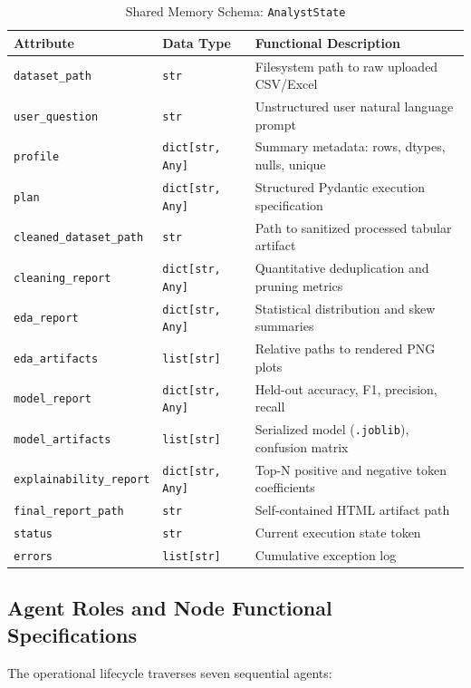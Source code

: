 \documentclass[conference]{IEEEtran}
\begin{document}
\begin{table}[htbp]
\caption{Shared Memory Schema: \texttt{AnalystState}}
\label{tab:state_contract}
\centering
\scriptsize
\begin{tabularx}{\columnwidth}{@{}p{}p{}X@{}}
\toprule
\textbf{Attribute} & \textbf{Data Type} & \textbf{Functional Description} \\
\midrule
\texttt{dataset\_path} & \texttt{str} & Filesystem path to raw uploaded CSV/Excel \\
\texttt{user\_question} & \texttt{str} & Unstructured user natural language prompt \\
\texttt{profile} & \texttt{dict[str, Any]} & Summary metadata: rows, dtypes, nulls, unique \\
\texttt{plan} & \texttt{dict[str, Any]} & Structured Pydantic execution specification \\
\texttt{cleaned\_dataset\_path} & \texttt{str} & Path to sanitized processed tabular artifact \\
\texttt{cleaning\_report} & \texttt{dict[str, Any]} & Quantitative deduplication and pruning metrics \\
\texttt{eda\_report} & \texttt{dict[str, Any]} & Statistical distribution and skew summaries \\
\texttt{eda\_artifacts} & \texttt{list[str]} & Relative paths to rendered PNG plots \\
\texttt{model\_report} & \texttt{dict[str, Any]} & Held-out accuracy, F1, precision, recall \\
\texttt{model\_artifacts} & \texttt{list[str]} & Serialized model (\texttt{.joblib}), confusion matrix \\
\texttt{explainability\_report} & \texttt{dict[str, Any]} & Top-N positive and negative token coefficients \\
\texttt{final\_report\_path} & \texttt{str} & Self-contained HTML artifact path \\
\texttt{status} & \texttt{str} & Current execution state token \\
\texttt{errors} & \texttt{list[str]} & Cumulative exception log \\
\bottomrule
\end{tabularx}
\end{table}

\subsection{Agent Roles and Node Functional Specifications}
The operational lifecycle traverses seven sequential agents:
\end{document}
